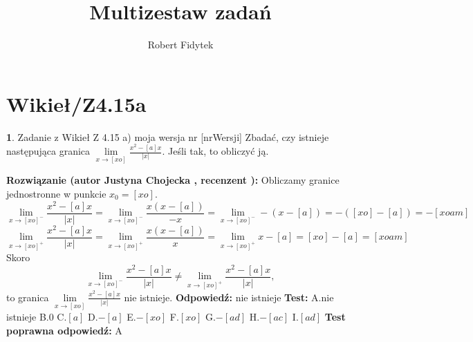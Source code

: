\documentclass[12pt, a4paper]{article}
\title{Multizestaw zadań}
\author{Robert Fidytek}
\date{}
\theoremstyle{definition} %
\newtheorem{zad}{}
\newcommand{\kategoria}[1]{\section{#1}} %
\newcommand{\zadStart}[1]{\begin{zad}#1\newline} %
\newcommand{\zadStop}{\end{zad}}   %
\newcommand{\rozwStart}[2]{\noindent \textbf{Rozwiązanie (autor #1 , recenzent #2): }\newline} %
\newcommand{\rozwStop}{\newline}                                            %
\newcommand{\odpStart}{\noindent \textbf{Odpowiedź:}\newline}    %
\newcommand{\odpStop}{\newline}                                             %
\newcommand{\testStart}{\noindent \textbf{Test:}\newline} %
\newcommand{\testStop}{\newline} %
\newcommand{\kluczStart}{\noindent \textbf{Test poprawna odpowiedź:}\newline} %
\newcommand{\kluczStop}{\newline} %
\begin{document}
\maketitle


\kategoria{Wikieł/Z4.15a}
\zadStart{Zadanie z Wikieł Z 4.15 a) moja wersja nr [nrWersji]}
Zbadać, czy istnieje następująca granica $\lim\limits_{x\to [xo]}\frac{x^{2}-[a]x}{|x|}$. Jeśli tak, to obliczyć ją.
\zadStop
\rozwStart{Justyna Chojecka}{}
Obliczamy granice jednostronne w punkcie $x_{0}=[xo]$.
$$\lim\limits_{x\to [xo]^{-}}\frac{x^{2}-[a]x}{|x|}=\lim\limits_{x\to [xo]^{-}}\frac{x(x-[a])}{-x}=\lim\limits_{x\to [xo]^{-}}-(x-[a])=-([xo]-[a])=-[xoam]$$
$$\lim\limits_{x\to [xo]^{+}}\frac{x^{2}-[a]x}{|x|}=\lim\limits_{x\to [xo]^{+}}\frac{x(x-[a])}{x}=\lim\limits_{x\to [xo]^{+}}x-[a]=[xo]-[a]=[xoam]$$
Skoro 
$$\lim\limits_{x\to [xo]^{-}}\frac{x^{2}-[a]x}{|x|}\neq \lim\limits_{x\to [xo]^{+}}\frac{x^{2}-[a]x}{|x|},$$
to granica $\lim\limits_{x\to [xo]}\frac{x^{2}-[a]x}{|x|}$ nie istnieje.
\rozwStop
\odpStart
nie istnieje
\odpStop
\testStart
A.nie istnieje
B.0
C.$[a]$
D.$-[a]$
E.$-[xo]$
F.$[xo]$
G.$-[ad]$
H.$-[ac]$
I.$[ad]$
\testStop
\kluczStart
A
\kluczStop
\end{document}
